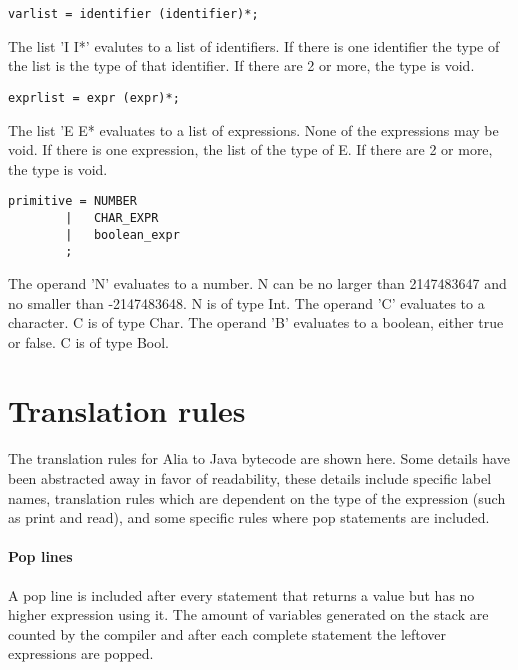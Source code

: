 \documentclass[paper=a4, fontsize=11pt]{article}
\numberwithin{equation}{section}		%
\numberwithin{figure}{section}			%
\numberwithin{table}{section}				%
\begin{document}
\begin{verbatim}
varlist = identifier (identifier)*;
\end{verbatim}
The list 'I I*' evalutes to a list of identifiers. If there is one identifier the type of the list is the type of that identifier. If there are 2 or more, the type is void.
\begin{verbatim}
exprlist = expr (expr)*;
\end{verbatim}
The list 'E E* evaluates to a list of expressions. None of the expressions may be void. If there is one expression, the list of the type of E. If there are 2 or more, the type is void.
\begin{verbatim}	
primitive =	NUMBER
		|	CHAR_EXPR
		|	boolean_expr
		;
\end{verbatim}
The operand 'N' evaluates to a number. N can be no larger than 2147483647 and no smaller than -2147483648. N is of type Int.
The operand 'C' evaluates to a character. C is of type Char.
The operand 'B' evaluates to a boolean, either true or false. C is of type Bool.

\section{Translation rules} %
The translation rules for Alia to Java bytecode are shown here. Some details have been abstracted away in favor of readability, these details include specific label names, translation rules which are dependent on the type of the expression (such as print and read), and some specific rules where pop statements are included.

\paragraph{Pop lines}
A pop line is included after every statement that returns a value but has no higher expression using it. The amount of variables generated on the stack are counted by the compiler and after each complete statement the leftover expressions are popped.
\end{document}
